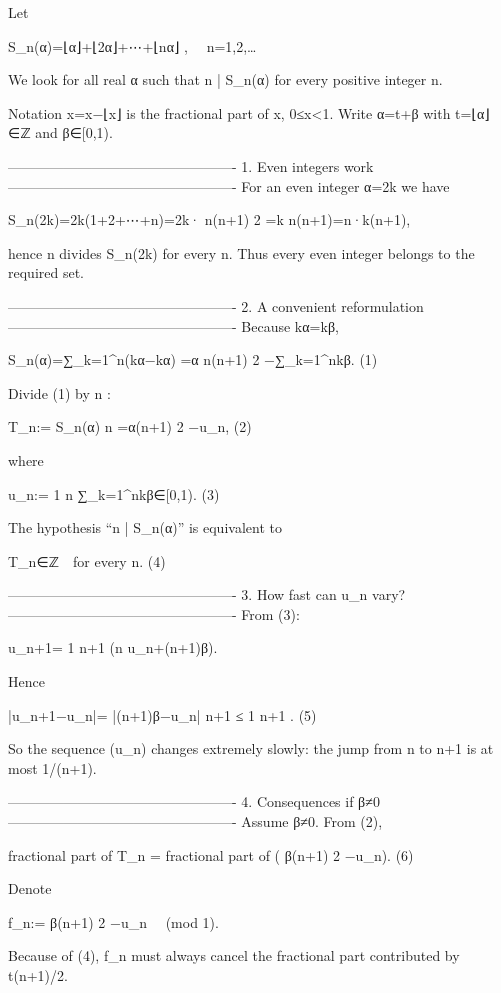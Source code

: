 Let  

S_n(α)=⌊α⌋+⌊2α⌋+⋯+⌊nα⌋ ,  n=1,2,…

We look for all real α such that n | S_n(α) for every positive integer n.

Notation  
{x}=x−⌊x⌋ is the fractional part of x, 0≤{x}<1.  
Write α=t+β with t=⌊α⌋∈ℤ and β∈[0,1).

-------------------------------------------------
1.  Even integers work
-------------------------------------------------
For an even integer α=2k we have  

S_n(2k)=2k(1+2+⋯+n)=2k· n(n+1) 2 =k n(n+1)=n·k(n+1),

hence n divides S_n(2k) for every n.  
Thus every even integer belongs to the required set.

-------------------------------------------------
2.  A convenient reformulation
-------------------------------------------------
Because {kα}={kβ},  

S_n(α)=∑_{k=1}^{n}(kα−{kα})  
      =α n(n+1) 2 −∑_{k=1}^{n}{kβ}.                         (1)

Divide (1) by n :

T_n:= S_n(α) n =α(n+1) 2 −u_n,             (2)

where  

u_n:= 1 n ∑_{k=1}^{n}{kβ}∈[0,1).          (3)

The hypothesis “n | S_n(α)” is equivalent to  

T_n∈ℤ for every n.                         (4)

-------------------------------------------------
3.  How fast can u_n vary?
-------------------------------------------------
From (3):

u_{n+1}= 1 n+1 (n u_n+{(n+1)β}).

Hence  

|u_{n+1}−u_n|= |{(n+1)β}−u_n| n+1 ≤ 1 n+1 .         (5)

So the sequence (u_n) changes extremely slowly: the jump from n to n+1
is at most 1/(n+1).

-------------------------------------------------
4.  Consequences if β≠0
-------------------------------------------------
Assume β≠0.  
From (2),

fractional part of T_n = fractional part of ( β(n+1) 2 −u_n).         (6)

Denote  

f_n:= β(n+1) 2 −u_n  (mod 1).

Because of (4), f_n must always cancel the fractional part contributed
by t(n+1)/2.

